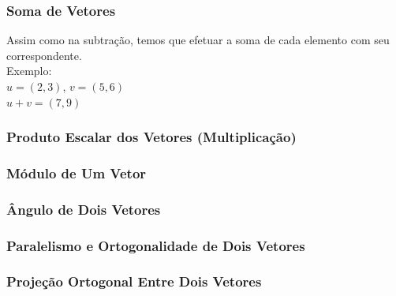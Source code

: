 \documentclass[12pt]{article}
\begin{document}
\pagebreak
\subsubsection{Soma de Vetores}

Assim como na subtração, temos que efetuar a soma de cada elemento com seu correspondente.\\

Exemplo:\\

\(u = (2, 3)\), \(v = (5, 6)\)\\

\(u + v = (7, 9)\)\\

\subsubsection{Produto Escalar dos Vetores (Multiplicação)}
\subsubsection{Módulo de Um Vetor}
\subsubsection{Ângulo de Dois Vetores}
\subsubsection{Paralelismo e Ortogonalidade de Dois Vetores}
\subsubsection{Projeção Ortogonal Entre Dois Vetores}




	
\end{document}
